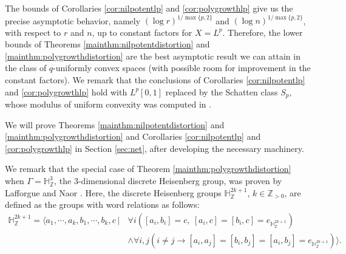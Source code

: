\documentclass[11pt,reqno]{amsart}
\newcommand{\1}{\mathbf 1}
\begin{document}
The bounds of Corollaries \ref{cor:nilpotentlp} and \ref{cor:polygrowthlp} give us the precise asymptotic behavior, namely $(\log r)^{1/\max\{p,2\}}$ and $(\log n)^{1/\max\{p,2\}}$, with respect to $r$ and $n$, up to constant factors for $X=L^p$. Therefore, the lower bounds of Theorems \ref{mainthm:nilpotentdistortion} and \ref{mainthm:polygrowthdistortion} are the best asymptotic result we can attain in the class of $q$-uniformly convex spaces (with possible room for improvement in the constant factors). We remark that the conclusions of Corollaries \ref{cor:nilpotentlp} and \ref{cor:polygrowthlp} hold with $L^p[0,1]$ replaced by the Schatten class $S_p$, whose modulus of uniform convexity was computed in \cite{tomczak1974moduli}.

We will prove Theorems \ref{mainthm:nilpotentdistortion} and \ref{mainthm:polygrowthdistortion} and Corollaries \ref{cor:nilpotentlp} and \ref{cor:polygrowthlp} in Section \ref{sec:net}, after developing the necessary machinery.

We remark that the special case of Theorem \ref{mainthm:polygrowthdistortion} when $\Gamma=\mathbb{H}_\mathbb{Z}^3$, the 3-dimensional discrete Heisenberg group, was proven by Lafforgue and Naor \cite{lafforgue2014vertical}. Here, the discrete Heisenberg groups $\mathbb{H}^{2k+1}_\mathbb{Z}$, $k\in \mathbb{Z}_{>0}$, are defined as the groups with word relations as follows:
\begin{align*}
\mathbb{H}^{2k+1}_\mathbb{Z}= \Big\langle a_1,\cdots,a_k,b_1,\cdots,b_k,c\,\Big|\,& \forall i\left(\left[a_i,b_i\right]=c,~\left[a_i,c\right]=\left[b_i,c\right]=e_{\mathbb{H}_\mathbb{Z}^{2k+1}}\right) \\
& \wedge \forall i,j\left(i\neq j\rightarrow \left[a_i,a_j\right]=\left[b_i,b_j\right]=\left[a_i,b_j\right]=e_{\mathbb{H}_\mathbb{Z}^{2k+1}}\right)\Big\rangle.
\end{align*}
\end{document}
